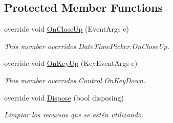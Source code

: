 \subsection*{Protected Member Functions}
\begin{DoxyCompactItemize}
\item 
override void \mbox{\hyperlink{class_custom_controls_1_1_nullable_date_time_picker_abae021db5f6f9836f2b010ce0d962076}{On\+Close\+Up}} (Event\+Args e)
\begin{DoxyCompactList}\small\item\em This member overrides Date\+Time\+Picker.\+On\+Close\+Up. \end{DoxyCompactList}\item 
override void \mbox{\hyperlink{class_custom_controls_1_1_nullable_date_time_picker_a56546974d2a84d7a88065eff1e5bc25e}{On\+Key\+Up}} (Key\+Event\+Args e)
\begin{DoxyCompactList}\small\item\em This member overrides Control.\+On\+Key\+Down. \end{DoxyCompactList}\item 
override void \mbox{\hyperlink{class_custom_controls_1_1_nullable_date_time_picker_aa8f2112f0653075b0405e3ef6ddafa0b}{Dispose}} (bool disposing)
\begin{DoxyCompactList}\small\item\em Limpiar los recursos que se estén utilizando. \end{DoxyCompactList}\end{DoxyCompactItemize}
